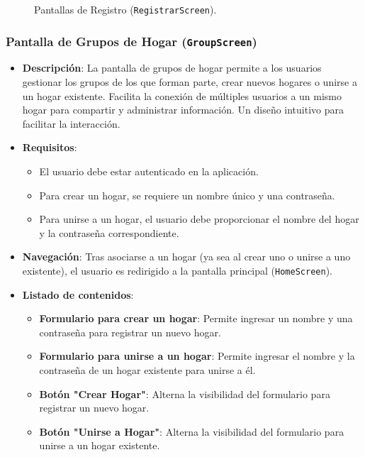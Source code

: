 \documentclass{article}
\begin{document}
\begin{flushleft}
\begin{figure}[H]
    \caption{Pantallas de Registro (\texttt{RegistrarScreen}).}
    \label{fig:registrar_screen}
\end{figure}



\clearpage

\subsubsection{Pantalla de Grupos de Hogar (\texttt{GroupScreen})}
\begin{itemize}
    \item \textbf{Descripci\'on}: 
    La pantalla de grupos de hogar permite a los usuarios gestionar los grupos de los que forman parte, crear nuevos hogares o unirse a un hogar existente. Facilita la conexi\'on de m\'ultiples usuarios a un mismo hogar para compartir y administrar informaci\'on. Un dise\~no intuitivo para facilitar la interacci\'on.

    \item \textbf{Requisitos}: 
    \begin{itemize}
        \item El usuario debe estar autenticado en la aplicaci\'on.
        \item Para crear un hogar, se requiere un nombre \'unico y una contrase\~na.
        \item Para unirse a un hogar, el usuario debe proporcionar el nombre del hogar y la contrase\~na correspondiente.
    \end{itemize}

    \item \textbf{Navegaci\'on}: 
    Tras asociarse a un hogar (ya sea al crear uno o unirse a uno existente), el usuario es redirigido a la pantalla principal (\texttt{HomeScreen}).

    \item \textbf{Listado de contenidos}: 
    \begin{itemize}
        \item \textbf{Formulario para crear un hogar}: Permite ingresar un nombre y una contrase\~na para registrar un nuevo hogar.
        \item \textbf{Formulario para unirse a un hogar}: Permite ingresar el nombre y la contrase\~na de un hogar existente para unirse a \'el.
        \item \textbf{Bot\'on "Crear Hogar"}: Alterna la visibilidad del formulario para registrar un nuevo hogar.
        \item \textbf{Bot\'on "Unirse a Hogar"}: Alterna la visibilidad del formulario para unirse a un hogar existente.
    \end{itemize}


\end{itemize}
\end{flushleft}
\end{document}
